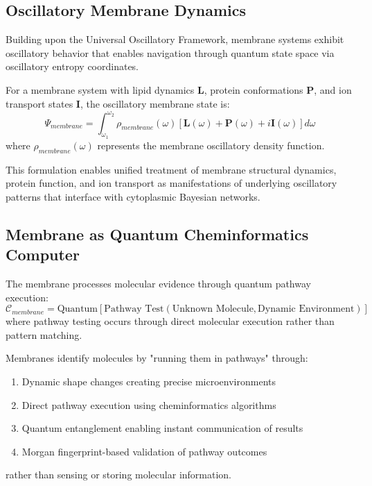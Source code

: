 ﻿\documentclass[11pt,a4paper]{article}
\begin{document}
\subsection{Oscillatory Membrane Dynamics}

Building upon the Universal Oscillatory Framework, membrane systems exhibit oscillatory behavior that enables navigation through quantum state space via oscillatory entropy coordinates.

\begin{definition}
For a membrane system with lipid dynamics $\mathbf{L}$, protein conformations $\mathbf{P}$, and ion transport states $\mathbf{I}$, the oscillatory membrane state is:
\begin{equation}
\Psi_{membrane} = \int_{\omega_1}^{\omega_2} \rho_{membrane}(\omega) [\mathbf{L}(\omega) + \mathbf{P}(\omega) + i\mathbf{I}(\omega)] d\omega
\end{equation}
where $\rho_{membrane}(\omega)$ represents the membrane oscillatory density function.
\end{definition}

This formulation enables unified treatment of membrane structural dynamics, protein function, and ion transport as manifestations of underlying oscillatory patterns that interface with cytoplasmic Bayesian networks.

\subsection{Membrane as Quantum Cheminformatics Computer}

\begin{definition}
The membrane processes molecular evidence through quantum pathway execution:
\begin{equation}
\mathcal{C}_{membrane} = \text{Quantum}\left[\text{Pathway Test}(\text{Unknown Molecule}, \text{Dynamic Environment})\right]
\end{equation}
where pathway testing occurs through direct molecular execution rather than pattern matching.
\end{definition}

\begin{theorem}
Membranes identify molecules by "running them in pathways" through:
\begin{enumerate}
\item Dynamic shape changes creating precise microenvironments
\item Direct pathway execution using cheminformatics algorithms
\item Quantum entanglement enabling instant communication of results
\item Morgan fingerprint-based validation of pathway outcomes
\end{enumerate}
rather than sensing or storing molecular information.
\end{theorem}
\end{document}
